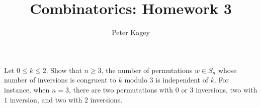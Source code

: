 \documentclass{article}
\newenvironment{problem}[2][Problem]{\begin{trivlist}
\item[\hskip \labelsep {\bfseries #1}\hskip \labelsep {\bfseries #2.}]}{\end{trivlist}}
\begin{document}
\title{Combinatorics: Homework 3}
\author{Peter Kagey}

\maketitle

\begin{problem}{1} $ $ \\
  Let $0 \leq k \leq 2$. Show that $n \geq 3$, the number of permutations
  $w \in S_n$ whose number of inversions is congruent to $k$ modulo $3$ is
  independent of $k$. For instance, when $n = 3$, there are two permutations
  with $0$ or $3$ inversions, two with $1$ inversion, and two with $2$
  inversions.
\end{problem}
\end{document}
